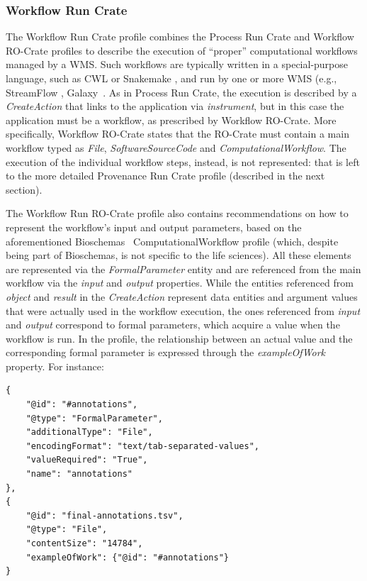 \subsubsection{Workflow Run Crate}\label{ch54:workflow-run-crate}

The Workflow Run Crate profile combines the Process Run Crate and Workflow RO-Crate  profiles to describe the execution of “proper” computational workflows managed by a WMS.
Such workflows are typically written in a special-purpose language, such as CWL or Snakemake
\cite{Koster 2012}, and run by one or more WMS (e.g., StreamFlow
\cite{Colonnelli 2020}, Galaxy~\cite{Galaxy 2022}.
As in Process Run Crate, the execution is described by a \emph{CreateAction}
that links to the application via \emph{instrument}, but in this case the application must be a workflow, as prescribed by Workflow RO-Crate.
More specifically, Workflow RO-Crate states that the RO-Crate must contain a main workflow typed as \emph{File}, \emph{SoftwareSourceCode}
and \emph{ComputationalWorkflow}.
The execution of the individual workflow steps, instead, is not represented: that is left to the more detailed Provenance Run Crate profile (described in the next section).

The Workflow Run RO-Crate profile also contains recommendations on how to represent the workflow's input and output parameters, based on the aforementioned Bioschemas~\cite{Gray 2017} ComputationalWorkflow profile (which, despite being part of Bioschemas, is not specific to the life sciences).
All these elements are represented via the \emph{FormalParameter} entity and are referenced from the main workflow via the \emph{input} and
\emph{output} properties.
While the entities referenced from
\emph{object} and \emph{result} in the \emph{CreateAction} represent data entities and argument values that were actually used in the workflow execution, the ones referenced from \emph{input} and
\emph{output} correspond to formal parameters, which acquire a value when the workflow is run.
In the profile, the relationship between an actual value and the corresponding formal parameter is expressed through the \emph{exampleOfWork} property.
For instance:

\begin{verbatim}
{
    "@id": "#annotations",
    "@type": "FormalParameter",
    "additionalType": "File",
    "encodingFormat": "text/tab-separated-values",
    "valueRequired": "True",
    "name": "annotations"
},
{
    "@id": "final-annotations.tsv",
    "@type": "File",
    "contentSize": "14784",
    "exampleOfWork": {"@id": "#annotations"}
}
\end{verbatim}

